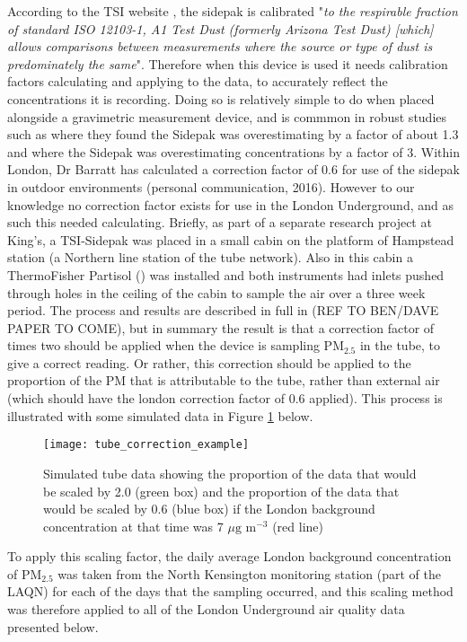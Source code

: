 According to the TSI website \cite{TSI2015}, the sidepak is calibrated "\textit{to the respirable fraction of standard ISO 12103-1, A1 Test Dust (formerly Arizona Test Dust) [which] allows comparisons between measurements where the source or type of dust is predominately the same}". Therefore when this device is used it needs calibration factors calculating and applying to the data, to accurately reflect the concentrations it is recording. Doing so is relatively simple to do when placed alongside a gravimetric measurement device, and is commmon in robust studies such as \cite{Torrey2015} where they found the Sidepak was overestimating by a factor of about 1.3 and \cite{Jiang2011} where the Sidepak was overestimating concentrations by a factor of 3. Within London, Dr Barratt has calculated a correction factor of 0.6 for use of the sidepak in outdoor environments (personal communication, 2016). However to our knowledge no correction factor exists for use in the London Underground, and as such this needed calculating. Briefly, as part of a separate research project at King's, a TSI-Sidepak was placed in a small cabin on the platform of Hampstead station (a Northern line station of the tube network). Also in this cabin a ThermoFisher Partisol (\cite{ThermoFisherScientific2016}) was installed and both instruments had inlets pushed through holes in the ceiling of the cabin to sample the air over a three week period. The process and results are described in full in (REF TO BEN/DAVE PAPER TO COME), but in summary the result is  that a correction factor of times two should be applied when the device is sampling PM$_{2.5}$ in the tube, to give a correct reading. Or rather, this correction should be applied to the proportion of the PM that is attributable to the tube, rather than external air (which should have the london correction factor of 0.6 applied). This process is illustrated with some simulated data in Figure \ref{fig:tube_correction_example} below.

\begin{figure}[H]
\centering
\texttt{[image: tube\_correction\_example]}
\caption{Simulated tube data showing the proportion of the data that would be scaled by 2.0 (green box) and the proportion of the data that would be scaled by 0.6 (blue box) if the London background concentration at that time was 7 $\mu \text{g m}^{-3}$ (red line)}
\label{fig:tube_correction_example}
\end{figure}

To apply this scaling factor, the daily average London background concentration of PM$_{2.5}$ was taken from the North Kensington monitoring station (part of the LAQN) for each of the days that the sampling occurred, and this scaling method was therefore applied to all of the London Underground air quality data presented below.

